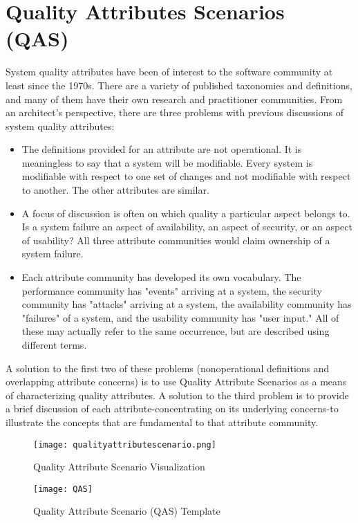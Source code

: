 \section{Quality Attributes Scenarios (QAS)}
System quality attributes have been of interest to the software community at least since the 1970s. There are a variety of published taxonomies and definitions, and many of them have their own research and practitioner communities. From an architect's perspective, there are three problems with previous discussions of system quality attributes:

\begin{itemize}
  \item The definitions provided for an attribute are not operational. It is meaningless to say that a system will be modifiable. Every system is modifiable with respect to one set of changes and not modifiable with respect to another. The other attributes are similar.
  \item A focus of discussion is often on which quality a particular aspect belongs to. Is a system failure an aspect of availability, an aspect of security, or an aspect of usability? All three attribute communities would claim ownership of a system failure.
  \item Each attribute community has developed its own vocabulary. The performance community has "events" arriving at a system, the security community has "attacks" arriving at a system, the availability community has "failures" of a system, and the usability community has "user input." All of these may actually refer to the same occurrence, but are described using different terms.
\end{itemize}

A solution to the first two of these problems (nonoperational definitions and overlapping attribute concerns) is to use Quality Attribute Scenarios as a means of characterizing quality attributes. A solution to the third problem is to provide a brief discussion of each attribute-concentrating on its underlying concerns-to illustrate the concepts that are fundamental to that attribute community.

\begin{figure}[H]
  \centering
  \texttt{[image: qualityattributescenario.png]}
  \caption{Quality Attribute Scenario Visualization}
\end{figure}

\begin{figure}[H]
  \center
  \texttt{[image: QAS]}
  \caption{Quality Attribute Scenario (QAS) Template}
\end{figure}

